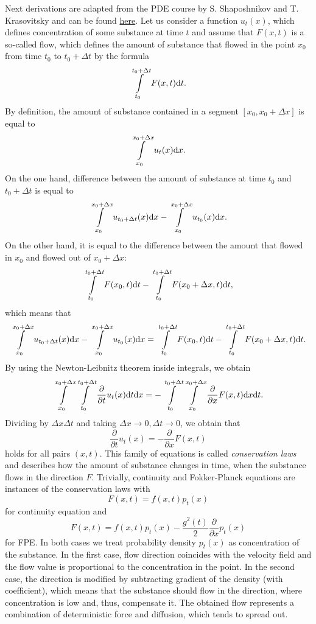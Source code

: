 Next derivations are adapted from the PDE course by S. Shaposhnikov and T. Krasovitsky and can be found \href{http://wiki.cs.hse.ru/%D0%A3%D1%80%D0%B0%D0%B2%D0%BD%D0%B5%D0%BD%D0%B8%D1%8F_%D1%81_%D1%87%D0%B0%D1%81%D1%82%D0%BD%D1%8B%D0%BC%D0%B8_%D0%BF%D1%80%D0%BE%D0%B8%D0%B7%D0%B2%D0%BE%D0%B4%D0%BD%D1%8B%D0%BC%D0%B8_(2022-2023)}{here}. Let us consider a function $u_t(x)$, which defines concentration of some substance at time $t$ and assume that $F(x, t)$ is a so-called flow, which defines the amount of substance that flowed in the point $x_0$ from time $t_0$ to $t_0 + \Delta t$ by the formula 
\[
    \int\limits_{t_0}^{t_0 + \Delta t} F(x, t) \mathrm{d} t.
\]
By definition, the amount of substance contained in a segment $[x_0, x_0 + \Delta x]$ is equal to
\[
    \int\limits_{x_0}^{x_0 + \Delta x} u_t(x) \mathrm{d} x.
\]
On the one hand, difference between the amount of substance at time $t_0$ and $t_0 + \Delta t$ is equal to
\[
    \int\limits_{x_0}^{x_0 + \Delta x} u_{t_0 + \Delta t}(x) \mathrm{d} x -     \int\limits_{x_0}^{x_0 + \Delta x} u_{t_0}(x) \mathrm{d} x.
\]
On the other hand, it is equal to the difference between the amount that flowed in $x_0$ and flowed out of $x_0 + \Delta x$:
\[
    \int\limits_{t_0}^{t_0 + \Delta t} F(x_0, t) \mathrm{d} t -     \int\limits_{t_0}^{t_0 + \Delta t} F(x_0 + \Delta x, t) \mathrm{d} t,
\]
which means that
\[
    \int\limits_{x_0}^{x_0 + \Delta x} u_{t_0 + \Delta t}(x) \mathrm{d} x -     \int\limits_{x_0}^{x_0 + \Delta x} u_{t_0}(x) \mathrm{d} x = \int\limits_{t_0}^{t_0 + \Delta t} F(x_0, t) \mathrm{d} t -     \int\limits_{t_0}^{t_0 + \Delta t} F(x_0 + \Delta x, t) \mathrm{d} t.
\]
By using the Newton-Leibnitz theorem inside integrals, we obtain
\[
    \int\limits_{x_0}^{x_0 + \Delta x} \int\limits_{t_0}^{t_0 + \Delta t} \frac{\partial}{\partial t} u_t(x) \mathrm{d} t \mathrm{d} x = - \int\limits_{t_0}^{t_0 + \Delta t}\int\limits_{x_0}^{x_0 + \Delta x} \frac{\partial}{\partial x} F(x, t) \mathrm{d} x \mathrm{d} t.
\]
Dividing by $\Delta x \Delta t$ and taking $\Delta x \rightarrow 0, \Delta t \rightarrow 0$, we obtain that
\[
    \frac{\partial}{\partial t} u_{t}(x) = -\frac{\partial}{\partial x}F(x, t)
\]
holds for all pairs $(x, t)$. This family of equations is called \emph{conservation laws} and describes how the amount of substance changes in time, when the substance flows in the direction $F$. Trivially, continuity and Fokker-Planck equations are instances of the conservation laws with
\[
    F(x, t) = f(x, t)p_t(x)
\]
for continuity equation and
\[
    F(x, t) = f(x, t)p_t(x) - \frac{g^2(t)}{2} \frac{\partial}{\partial x} p_t(x)
\]
for FPE. In both cases we treat probability density $p_t(x)$ as concentration of the substance. In the first case, flow direction coincides with the velocity field and the flow value is proportional to the concentration in the point. In the second case, the direction is modified by subtracting gradient of the density (with coefficient), which means that the substance should flow in the direction, where concentration is low and, thus, compensate it. The obtained flow represents a combination of deterministic force and diffusion, which tends to spread out.

